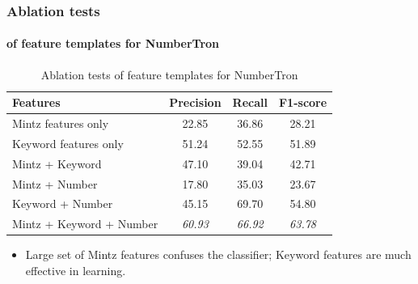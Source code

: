 \documentclass{beamer}
\begin{document}
\begin{frame}
\frametitle{Ablation tests}
\framesubtitle{of feature templates for NumberTron}

\begin{table}
\begin{tabular}{|l|c|c|c|}
\hline
Features & Precision & Recall & F1-score \\
\hline
\hline
Mintz features only & 22.85 & 36.86 & 28.21 \\
\hline
Keyword features only & 51.24 & 52.55 & 51.89 \\
\hline
Mintz + Keyword & 47.10 & 39.04 & 42.71\\
\hline
Mintz + Number & 17.80 & 35.03 & 23.67 \\
\hline
Keyword + Number & 45.15 & 69.70 & 54.80\\
\hline
Mintz + Keyword + Number & \emph{60.93} & \emph{66.92} & \emph{63.78}\\
\hline
\end{tabular}
\caption{Ablation tests of feature templates for NumberTron}
\label{tab:ablationtests}
\end{table}

\begin{itemize}
\item Large set of Mintz features confuses the classifier; Keyword features are much effective in learning.
\end{itemize}


\end{frame}
\end{document}
